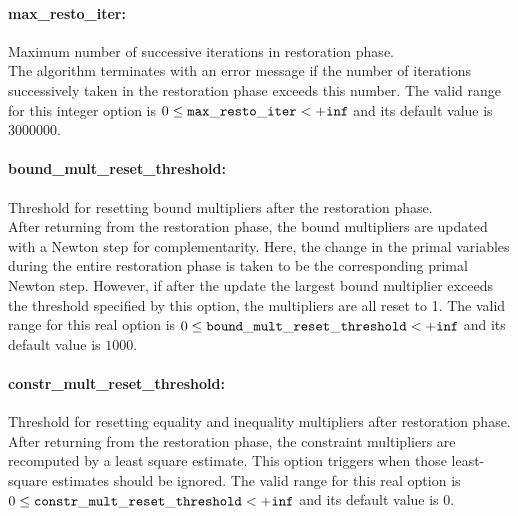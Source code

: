 \paragraph{max\_resto\_iter:} Maximum number of successive iterations in restoration phase. $\;$ \\
 The algorithm terminates with an error message if
the number of iterations successively taken in
the restoration phase exceeds this number. The valid range for this integer option is
$0 \le {\tt max\_resto\_iter } <  {\tt +inf}$
and its default value is $3000000$.


\paragraph{bound\_mult\_reset\_threshold:} Threshold for resetting bound multipliers after the restoration phase. $\;$ \\
 After returning from the restoration phase, the
bound multipliers are updated with a Newton step
for complementarity.  Here, the change in the
primal variables during the entire restoration
phase is taken to be the corresponding primal
Newton step. However, if after the update the
largest bound multiplier exceeds the threshold
specified by this option, the multipliers are all
reset to 1. The valid range for this real option is 
$0 \le {\tt bound\_mult\_reset\_threshold } <  {\tt +inf}$
and its default value is $1000$.


\paragraph{constr\_mult\_reset\_threshold:} Threshold for resetting equality and inequality multipliers after restoration phase. $\;$ \\
 After returning from the restoration phase, the
constraint multipliers are recomputed by a least
square estimate.  This option triggers when those
least-square estimates should be ignored. The valid range for this real option is 
$0 \le {\tt constr\_mult\_reset\_threshold } <  {\tt +inf}$
and its default value is $0$.


